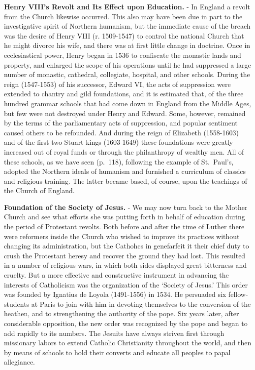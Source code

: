 \documentclass[
]{book}
\begin{document}
\textbf{Henry VIII's Revolt and Its Effect upon Education.} - In England a revolt from the Church likewise occurred. This also may have been due in part to the investigative spirit of Northern humanism, but the immediate cause of the breach was the desire of Henry VIII (r. 1509-1547) to control the national Church that he might divorce his wife, and there was at first little change in doctrine. Once in ecclesiastical power, Henry began in 1536 to confiscate the monastic lands and property, and enlarged the scope of his operations until he had suppressed a large number of monastic, cathedral, collegiate, hospital, and other schools. During the reign (1547-1553) of his successor, Edward VI, the acts of suppression were extended to chantry and gild foundations, and it is estimated that, of the three hundred grammar schools that had come down in England from the Middle Ages, but few were not destroyed under Henry and Edward. Some, however, remained by the terms of the parliamentary acts of suppression, and popular sentiment caused others to be refounded. And during the reign of Elizabeth (1558-1603) and of the first two Stuart kings (1603-1649) these foundations were greatly increased out of royal funds or through the philanthropy of wealthy men. All of these schools, as we have seen (p.~118), following the example of St.~Paul's, adopted the Northern ideals of humanism and furnished a curriculum of classics and religious training. The latter became based, of course, upon the teachings of the Church of England.

\textbf{Foundation of the Society of Jesus.} - We may now turn back to the Mother Church and see what efforts she was putting forth in behalf of education during the period of Protestant revolts. Both before and after the time of Luther there were reformers inside the Church who wished to improve its practices without changing its administration, but the Cathohcs in genefarfeit it their chief duty to crush the Protestant heresy and recover the ground they had lost. This resulted in a number of religious wars, in which both sides displayed great bitterness and cruelty. But a more effective and constructive instrument in advancing the interests of Catholicism was the organization of the `Society of Jesus.' This order was founded by Ignatius de Loyola (1491-1556) in 1534. He persuaded six fellow-students at Paris to join with him in devoting themselves to the conversion of the heathen, and to strengthening the authority of the pope. Six years later, after considerable opposition, the new order was recognized by the pope and began to add rapidly to its numbers. The Jesuits have always striven first through missionary labors to extend Catholic Christianity throughout the world, and then by means of schools to hold their converts and educate all peoples to papal allegiance.
\end{document}
